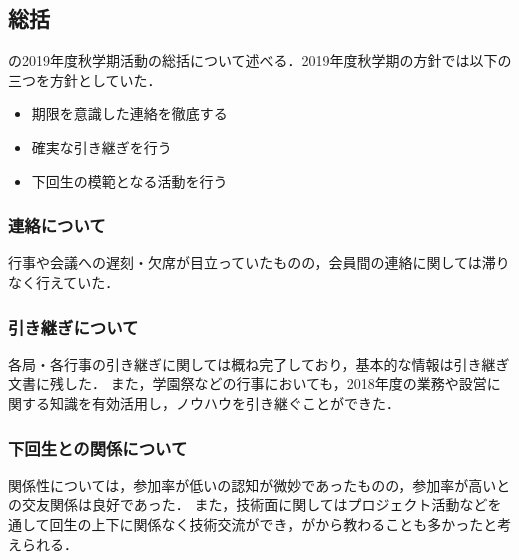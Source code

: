 \subsection*{\secondGrade{}総括}


\secondGrade{}の2019年度秋学期活動の総括について述べる．2019年度秋学期の方針では以下の三つを方針としていた．
\begin{itemize}
    \item 期限を意識した連絡を徹底する
    \item 確実な引き継ぎを行う
    \item 下回生の模範となる活動を行う

\end{itemize}

\subsubsection*{連絡について}
行事や会議への遅刻・欠席が目立っていたものの，会員間の連絡に関しては滞りなく行えていた． 
\subsubsection*{引き継ぎについて}
各局・各行事の引き継ぎに関しては概ね完了しており，基本的な情報は引き継ぎ文書に残した．
また，学園祭などの行事においても，2018年度の業務や設営に関する知識を有効活用し，ノウハウを引き継ぐことができた． 
\subsubsection*{下回生との関係について}
関係性については，参加率が低い\firstGrade{}の認知が微妙であったものの，参加率が高い\firstGrade{}との交友関係は良好であった．
また，技術面に関してはプロジェクト活動などを通して回生の上下に関係なく技術交流ができ，\secondGrade{}が\firstGrade{}から教わることも多かったと考えられる．